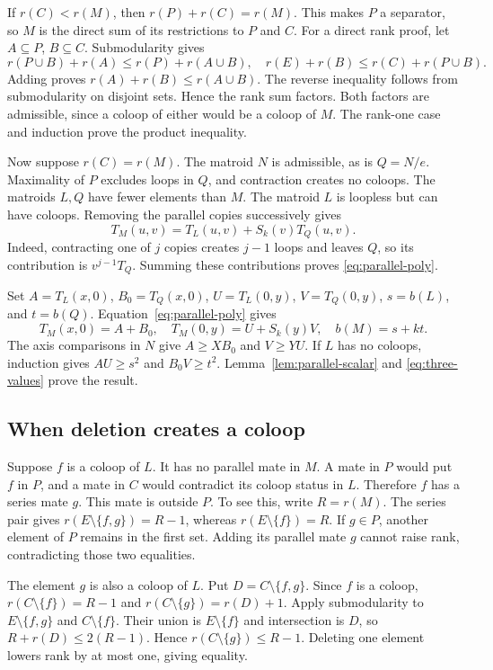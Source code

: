 \documentclass[11pt,a4paper]{article}
\begin{document}
If $r(C)<r(M)$, then $r(P)+r(C)=r(M)$. This makes $P$ a separator,
so $M$ is the direct sum of its restrictions to $P$ and $C$.
For a direct rank proof, let $A\subseteq P$, $B\subseteq C$.
Submodularity gives
\[
r(P\cup B)+r(A)\leq r(P)+r(A\cup B),\quad
r(E)+r(B)\leq r(C)+r(P\cup B).
\]
Adding proves $r(A)+r(B)\leq r(A\cup B)$. The reverse inequality follows
from submodularity on disjoint sets. Hence the rank sum factors.
Both factors are admissible, since a coloop of either would be a coloop
of $M$. The rank-one case and induction prove the product inequality.

Now suppose $r(C)=r(M)$. The matroid $N$ is admissible, as is $Q=N/e$.
Maximality of $P$ excludes loops in $Q$, and contraction creates no coloops.
The matroids $L,Q$ have fewer elements than $M$. The matroid $L$ is
loopless but can have coloops. Removing the parallel copies successively
gives
\begin{equation}\label{eq:parallel-poly}
T_M(u,v)=T_L(u,v)+S_k(v)T_Q(u,v).
\end{equation}
Indeed, contracting one of $j$ copies creates $j-1$ loops and leaves $Q$,
so its contribution is $v^{j-1}T_Q$. Summing these contributions proves
\eqref{eq:parallel-poly}.

Set $A=T_L(x,0)$, $B_0=T_Q(x,0)$, $U=T_L(0,y)$, $V=T_Q(0,y)$,
$s=b(L)$, and $t=b(Q)$. Equation~\eqref{eq:parallel-poly} gives
\begin{equation}\label{eq:three-values}
T_M(x,0)=A+B_0,\quad T_M(0,y)=U+S_k(y)V,\quad b(M)=s+kt.
\end{equation}
The axis comparisons in $N$ give $A\geq XB_0$ and $V\geq YU$.
If $L$ has no coloops, induction gives $AU\geq s^2$ and $B_0V\geq t^2$.
Lemma~\ref{lem:parallel-scalar} and \eqref{eq:three-values} prove the result.

\subsection{When deletion creates a coloop}
Suppose $f$ is a coloop of $L$. It has no parallel mate in $M$.
A mate in $P$ would put $f$ in $P$, and a mate in $C$ would contradict
its coloop status in $L$. Therefore $f$ has a series mate $g$.
This mate is outside $P$. To see this, write $R=r(M)$.
The series pair gives $r(E\setminus\{f,g\})=R-1$, whereas
$r(E\setminus\{f\})=R$. If $g\in P$, another element of $P$ remains
in the first set. Adding its parallel mate $g$ cannot raise rank,
contradicting those two equalities.

The element $g$ is also a coloop of $L$. Put $D=C\setminus\{f,g\}$.
Since $f$ is a coloop,
$r(C\setminus\{f\})=R-1$ and $r(C\setminus\{g\})=r(D)+1$.
Apply submodularity to $E\setminus\{f,g\}$ and $C\setminus\{f\}$.
Their union is $E\setminus\{f\}$ and intersection is $D$, so
$R+r(D)\leq2(R-1)$. Hence $r(C\setminus\{g\})\leq R-1$.
Deleting one element lowers rank by at most one, giving equality.
\end{document}
